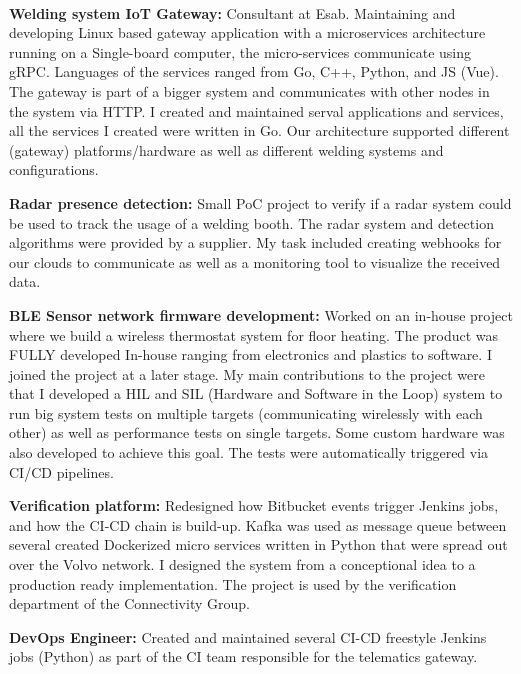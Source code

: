 
 \\
\SmallSep
\textbf{Welding system IoT Gateway:} Consultant at Esab. Maintaining and developing Linux based gateway application with a microservices architecture running on a Single-board computer, the micro-services communicate using gRPC. Languages of the services ranged from Go, C++, Python, and JS (Vue). The gateway is part of a bigger system and communicates with other nodes in the system via HTTP. I created and maintained serval applications and services, all the services I created were written in Go. Our architecture supported different (gateway) platforms/hardware as well as different welding systems and configurations.
\SmallSep 

\textbf{Radar presence detection:} Small PoC project to verify if a radar system could be used to track the usage of a welding booth. The radar system and detection algorithms were provided by a supplier. My task included creating webhooks for our clouds to communicate as well as a monitoring tool to visualize the received data. 
\SmallSep

\textbf{BLE Sensor network firmware development:} Worked on an in-house project where we build a wireless thermostat system for floor heating. The product was FULLY developed In-house ranging from electronics and plastics to software. I joined the project at a later stage. My main contributions to the project were that I developed a HIL and SIL (Hardware and Software in the Loop) system to run big system tests on multiple targets (communicating wirelessly with each other) as well as performance tests on single targets. Some custom hardware was also developed to achieve this goal. The tests were automatically triggered via CI/CD pipelines. \\ 
\Sep


\SmallSep
\textbf{Verification platform:} Redesigned how Bitbucket events trigger Jenkins jobs, and how the CI-CD chain is build-up. Kafka was used as message queue between several created Dockerized micro services written in Python that were spread out over the Volvo network. I designed the system from a conceptional idea to a production ready implementation. The project is used by the verification department of the Connectivity Group.
\SmallSep

\textbf{DevOps Engineer:} Created and maintained several CI-CD freestyle Jenkins jobs (Python) as part of the CI team responsible for the telematics gateway.
\SmallSep

